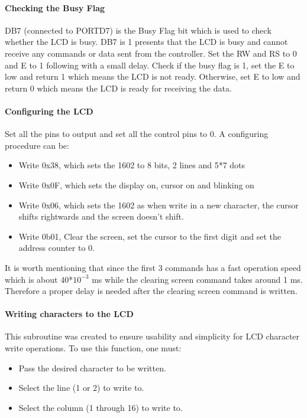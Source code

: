 \documentclass[]{report}
\begin{document}
\paragraph{Checking the Busy Flag}
DB7 (connected to PORTD7) is the Busy Flag bit which is used to check whether the LCD is busy. DB7 is 1 presents that the LCD is busy and cannot receive any commands or data sent from the controller. \newline
Set the RW and RS to 0 and E to 1 following with a small delay. Check if the busy flag is 1, set the E to low and return 1 which means the LCD is not ready. Otherwise, set E to low and return 0 which means the LCD is ready for receiving the data.

\paragraph{Configuring the LCD}
Set all the pins to output and set all the control pins to 0. A configuring procedure can be:
\begin{itemize}
	\item Write 0x38, which sets the 1602 to 8 bits, 2 lines and 5*7 dots
	\item Write 0x0F, which sets the display on, cursor on and blinking on
	\item Write 0x06, which sets the 1602 as when write in a new character, the cursor shifts rightwards and the screen doesn't shift.
	\item Write 0b01, Clear the screen, set the cursor to the first digit and set the address counter to 0.
\end{itemize}

     It is worth mentioning that since the first 3 commands has a fast operation speed which is about 40*$10^{-3}$ ms while the clearing screen command takes around 1 ms.  Therefore a proper delay is needed after the clearing screen command is written.
     
\paragraph{Writing characters to the LCD}
This subroutine was created to ensure usability and simplicity for LCD character write operations.
To use this function, one must:
\begin{itemize}
\item Pass the desired character to be written.
\item Select the line (1 or 2) to write to.
\item Select the column (1 through 16) to write to.
\end{itemize}
\end{document}
